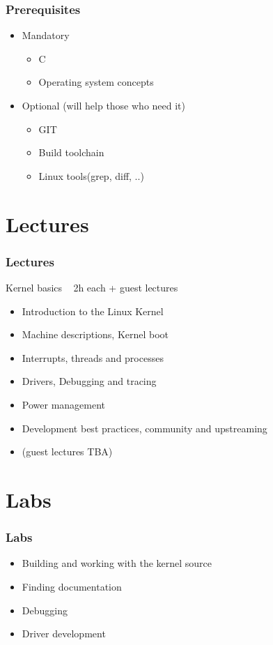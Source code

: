 \documentclass{beamer}
\begin{document}
\begin{frame}
\frametitle{Prerequisites}
\begin{itemize}
	\item Mandatory
	\begin{itemize}
		\item C
		\item Operating system concepts
	\end{itemize}

	\item Optional (will help those who need it)
	\begin{itemize}
		\item GIT
		\item Build toolchain
		\item Linux tools(grep, diff, ..)
	\end{itemize}
\end{itemize}
\end{frame}

\section{Lectures}
\begin{frame}
\frametitle{Lectures}
Kernel basics ~ 2h each + guest lectures
\begin{itemize}
	\item Introduction to the Linux Kernel	
	\item Machine descriptions, Kernel boot
	\item Interrupts, threads and processes
	\item Drivers, Debugging and tracing
	\item Power management
	\item Development best practices, community and upstreaming
	\item (guest lectures TBA)
\end{itemize}
\end{frame}

\section{Labs}
\begin{frame}
\frametitle{Labs}
\begin{itemize}
	\item Building and working with the kernel source
	\item Finding documentation
	\item Debugging
	\item Driver development
\end{itemize} 
\end{frame}
\end{document}
